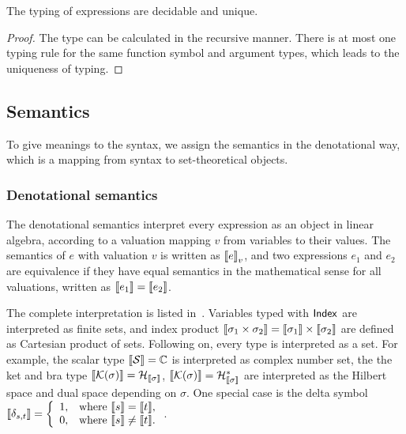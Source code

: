 \documentclass[runningheads]{llncs}
\begin{document}
\begin{lemma}
    The typing of expressions are decidable and unique.
\end{lemma}
\begin{proof}
    The type can be calculated in the recursive manner. There is at most one typing rule for the same function symbol and argument types, which leads to the uniqueness of typing.
\end{proof}

\subsection{Semantics}



To give meanings to the syntax, we assign the semantics in the denotational way, which is a mapping from syntax to set-theoretical objects.

\subsubsection{Denotational semantics} 
The denotational semantics interpret every expression as an object in linear algebra, according to a valuation mapping $v$ from variables to their values. 
The semantics of $e$ with valuation $v$ is written as ${\llbracket e \rrbracket}_v$, and two expressions $e_1$ and $e_2$ are equivalence if they have equal semantics in the mathematical sense for all valuations, written as ${\llbracket e_1 \rrbracket} = {\llbracket e_2 \rrbracket}$.

The complete interpretation is listed in~.
Variables typed with $\mathsf{Index}$ are interpreted as finite sets, and index product ${\llbracket \sigma_1 \times \sigma_2 \rrbracket} = {\llbracket \sigma_1 \rrbracket} \times {\llbracket \sigma_2 \rrbracket}$ are defined as Cartesian product of sets. Following on, every type is interpreted as a set. For example, the scalar type ${\llbracket \mathcal{S} \rrbracket} = \mathbb{C}$ is interpreted as complex number set, the the ket and bra type ${\llbracket \mathcal{K}(\sigma) \rrbracket} = \mathcal{H}_{{\llbracket \sigma \rrbracket}}$, ${\llbracket \mathcal{K}(\sigma) \rrbracket} = \mathcal{H}_{{\llbracket \sigma \rrbracket}}^*$ are interpreted as the Hilbert space and dual space depending on $\sigma$. One special case is the delta symbol 
${\llbracket \delta_{s, t} \rrbracket} = 
\left \{  
    \begin{array}{ll}
        1, & \text{where } {\llbracket s \rrbracket} = {\llbracket t \rrbracket}, \\
        0, & \text{where } {\llbracket s \rrbracket} \neq {\llbracket t \rrbracket}.
    \end{array} 
\right .
$.
\end{document}
